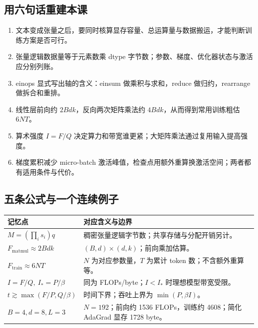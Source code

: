 \documentclass[UTF8,fontset=fandol,zihao=-4,a4paper]{ctexart}
\begin{document}
\subsection{用六句话重建本课}
\begin{enumerate}
\item 文本变成张量之后，要同时核算显存容量、总运算量与数据搬运，才能判断训练方案是否可行。
\item 张量逻辑数据量等于元素数乘 dtype 字节数；参数、梯度、优化器状态与激活应分别列账。
\item einops 显式写出轴的含义：einsum 做乘积与求和，reduce 做归约，rearrange 做拆合和重排。
\item 线性层前向约 $2Bdk$，反向两次矩阵乘法约 $4Bdk$，从而得到常用训练粗估 $6NT$。
\item 算术强度 $I=F/Q$ 决定算力和带宽谁更紧；大矩阵乘法通过复用输入提高强度。
\item 梯度累积减少 micro-batch 激活峰值，检查点用额外重算换激活空间；两者都有适用条件与代价。
\end{enumerate}

\subsection{五条公式与一个连续例子}
\par\noindent\begin{tabularx}{\linewidth}{@{}P{58mm}Y@{}}
\toprule
记忆点 & 对应含义与边界\\
\midrule
$M=(\prod_i s_i)q$ & 稠密张量逻辑字节数；共享存储与分配开销另计。\\
$F_{\text{matmul}}\approx2Bdk$ & $(B,d)\times(d,k)$；前向乘加估算。\\
$F_{\text{train}}\approx6NT$ & $N$ 为对应参数量，$T$ 为累计 token 数；不含额外重算等。\\
$I=F/Q,\ I_*=P/\beta$ & 同为 FLOPs/byte；$I<I_*$ 时理想模型带宽受限。\\
$t\gtrsim\max(F/P,Q/\beta)$ & 时间下界；吞吐上界为 $\min(P,\beta I)$。\\
$B=4,d=8,L=3$ & $N=192$；前向约 1536 FLOPs，训练约 4608；简化 AdaGrad 显存 1728 byte。\\
\bottomrule
\end{tabularx}
\end{document}
